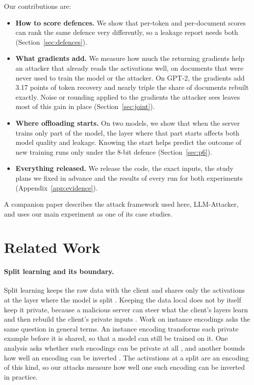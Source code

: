 \documentclass[11pt]{article}
\begin{document}
Our contributions are:
\begin{itemize}
\item \textbf{How to score defences.} We show that per-token and per-document scores can rank the same defence very differently, so a leakage report needs both (Section~\ref{sec:defences}).
\item \textbf{What gradients add.} We measure how much the returning gradients help an attacker that already reads the activations well, on documents that were never used to train the model or the attacker. On GPT-2, the gradients add 3.17 points of token recovery and nearly triple the share of documents rebuilt exactly. Noise or rounding applied to the gradients the attacker sees leaves most of this gain in place (Section~\ref{sec:joint}).
\item \textbf{Where offloading starts.} On two models, we show that when the server trains only part of the model, the layer where that part starts affects both model quality and leakage. Knowing the start helps predict the outcome of new training runs only under the 8-bit defence (Section~\ref{sec:p6}).
\item \textbf{Everything released.} We release the code, the exact inputs, the study plans we fixed in advance and the results of every run for both experiments (Appendix~\ref{app:evidence}).
\end{itemize}

A companion paper \cite{llmattacker2026framework} describes the attack framework used here, LLM-Attacker, and uses our main experiment as one of its case studies.

\section{Related Work}
\label{sec:related}
\paragraph{Split learning and its boundary.}
Split learning keeps the raw data with the client and shares only the activations at the layer where the model is split \cite{vepakomma2018split}. Keeping the data local does not by itself keep it private, because a malicious server can steer what the client's layers learn and then rebuild the client's private inputs \cite{pasquini2021unleashing}. Work on instance encodings asks the same question in general terms. An instance encoding transforms each private example before it is shared, so that a model can still be trained on it. One analysis asks whether such encodings can be private at all \cite{carlini2021instance}, and another bounds how well an encoding can be inverted \cite{maeng2022refil}. The activations at a split are an encoding of this kind, so our attacks measure how well one such encoding can be inverted in practice.
\end{document}

